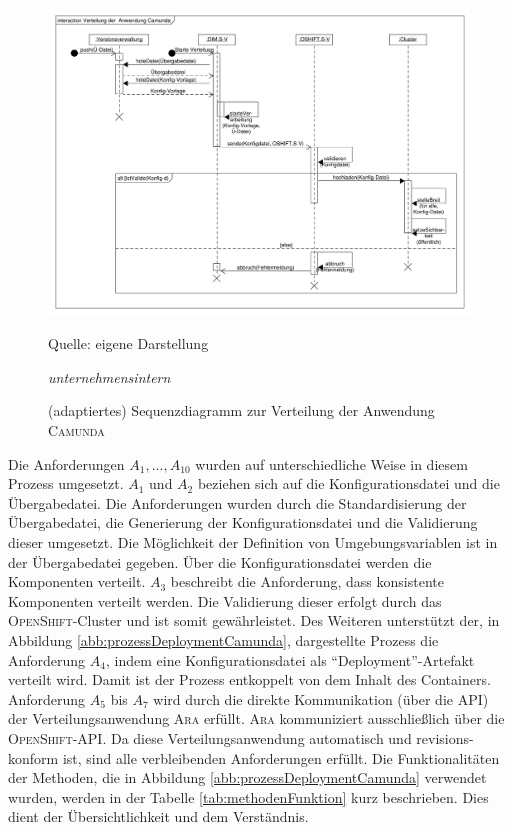 \begin{figure}[h!]
	\centering
	\includegraphics[scale=0.39]{img/prozessDeploymentCamunda.pdf}
	\caption{(adaptiertes) Sequenzdiagramm zur Verteilung der Anwendung \textsc{Camunda}}
	{\footnotesize Quelle: eigene Darstellung \par \textit{unternehmensintern}}
	\label{abb:prozessDeploymentCamunda}
\end{figure}
Die Anforderungen $A_{1}, ..., A_{10}$ wurden auf unterschiedliche Weise in diesem Prozess umgesetzt. $A_{1}$ und $A_{2}$ beziehen sich auf die Konfigurationsdatei und die Übergabedatei. Die Anforderungen wurden durch die Standardisierung der Übergabedatei, die Generierung der Konfigurationsdatei und die Validierung dieser umgesetzt. Die Möglichkeit der Definition von Umgebungsvariablen ist in der Übergabedatei gegeben. Über die Konfigurationsdatei werden die Komponenten verteilt. $A_{3}$ beschreibt die Anforderung, dass konsistente Komponenten verteilt werden. Die Validierung dieser erfolgt durch das \textsc{OpenShift}-Cluster und ist somit gewährleistet. Des Weiteren unterstützt der, in Abbildung \vref{abb:prozessDeploymentCamunda}, dargestellte Prozess die Anforderung $A_{4}$, indem eine Konfigurationsdatei als \enquote{Deployment}-Artefakt verteilt wird. Damit ist der Prozess entkoppelt von dem Inhalt des Containers. Anforderung $A_{5}$ bis $A_{7}$ wird durch die direkte Kommunikation (über die \ac{API}) der Verteilungsanwendung \textsc{Ara} erfüllt. \textsc{Ara} kommuniziert ausschließlich über die \textsc{OpenShift}-\ac{API}. Da diese Verteilungsanwendung automatisch und revisions-konform ist, sind alle verbleibenden Anforderungen erfüllt. Die Funktionalitäten der Methoden, die in Abbildung \vref{abb:prozessDeploymentCamunda} verwendet wurden, werden in der Tabelle \vref{tab:methodenFunktion} kurz beschrieben. Dies dient der Übersichtlichkeit und dem Verständnis. 

